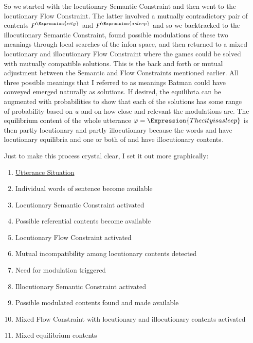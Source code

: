 So we started with the locutionary Semantic Constraint and then went to the locutionary Flow Constraint. The latter involved a mutually contradictory pair of contents $P^\Expression{city}$ and $P^\Expression{asleep}$ and so we backtracked to the illocutionary Semantic Constraint, found possible modulations of these two meanings through local searches of the infon space, and then returned to a mixed locutionary and illocutionary Flow Constraint where the games could be solved with mutually compatible solutions. This is the back and forth or mutual adjustment between the Semantic and Flow Constraints mentioned earlier. All three possible meanings that I referred to as meanings Batman could have conveyed emerged naturally as solutions. If desired, the equilibria can be augmented with probabilities to show that each of the solutions has some range of probability based on $u$ and on how close and relevant the modulations are. The equilibrium content of the whole utterance $\varphi = \Expression{The city is asleep}$ is then partly locutionary and partly illocutionary because the words  and  have locutionary equilibria and one or both of  and  have illocutionary contents.

Just to make this process crystal clear, I set it out more graphically:

\begin{enumerate}\setlength{\itemsep}{0pt}
\item[] \underline{Utterance Situation} 
\item[\functionarrow] Individual words of sentence become available 
\item[\functionarrow] Locutionary Semantic Constraint activated 
\item[\functionarrow] Possible referential contents become available 
\item[\functionarrow] Locutionary Flow Constraint activated 
\item[\functionarrow] Mutual incompatibility among locutionary contents detected 
\item[\functionarrow] Need for modulation triggered 
\item[\functionarrow] Illocutionary Semantic Constraint activated 
\item[\functionarrow] Possible modulated contents found and made available 
\item[\functionarrow] Mixed Flow Constraint with locutionary and illocutionary contents activated 
\item[\functionarrow] Mixed equilibrium contents
\end{enumerate}

